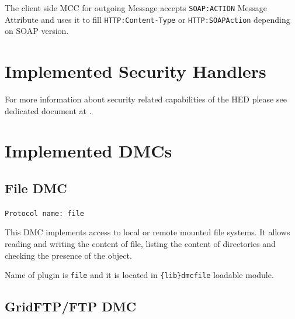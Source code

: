\documentclass{book}
\begin{document}
The client side MCC for outgoing Message accepts \texttt{SOAP:ACTION} Message Attribute and uses it to fill \texttt{HTTP:Content-Type} or \texttt{HTTP:SOAPAction} depending on SOAP version.


\section{Implemented Security Handlers}

For more information about security related capabilities of the HED please see dedicated document at \cite{sec-arc1}.

%
%


%
%


%
%


\section{Implemented DMCs}


\subsection{File DMC}

\texttt{Protocol name: file}

This DMC implements access to local or remote mounted file systems. It allows reading and writing the content of file, listing the content of directories and checking the presence of the object.

Name of plugin is \texttt{file} and it is located in \texttt{\{lib\}dmcfile} loadable module.


\subsection{GridFTP/FTP DMC}
\end{document}
